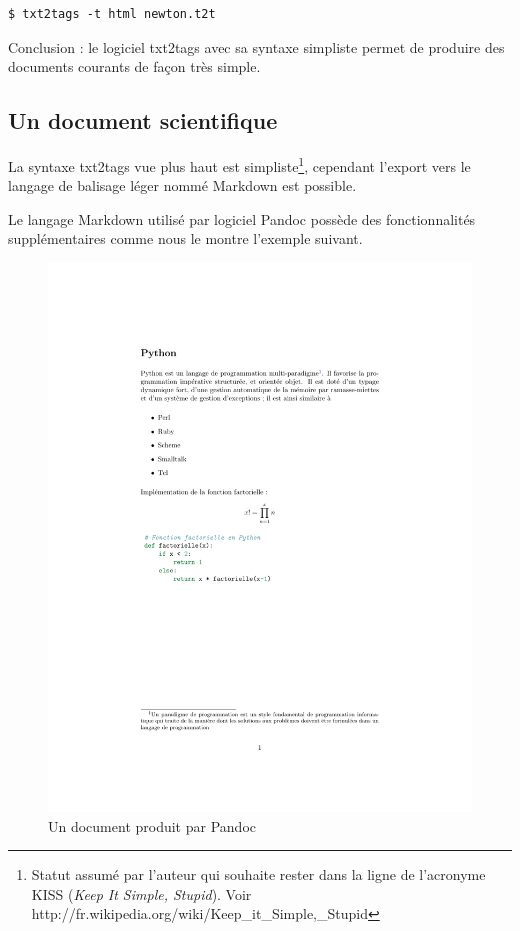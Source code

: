 \documentclass[]{article}
\makeatletter
\def\maxwidth{\ifdim\Gin@nat@width>\linewidth\linewidth
\else\Gin@nat@width\fi}
\let\Oldincludegraphics\includegraphics
\renewcommand{\includegraphics}[1]{\Oldincludegraphics[width=\maxwidth]{#1}}
\makeatother
\begin{document}
\begin{verbatim}
$ txt2tags -t html newton.t2t
\end{verbatim}
Conclusion : le logiciel txt2tags avec sa syntaxe simpliste permet de
produire des documents courants de façon très simple.

\subsection{Un document scientifique}

La syntaxe txt2tags vue plus haut est simpliste\footnote{Statut assumé
  par l'auteur qui souhaite rester dans la ligne de l'acronyme KISS
  (\emph{Keep It Simple, Stupid}). Voir
  http://fr.wikipedia.org/wiki/Keep\_it\_Simple,\_Stupid}, cependant
l'export vers le langage de balisage léger nommé Markdown est possible.

Le langage Markdown utilisé par logiciel Pandoc possède des
fonctionnalités supplémentaires comme nous le montre l'exemple suivant.

\begin{figure}[htbp]
\centering
\includegraphics{python.pdf}
\caption{Un document produit par Pandoc}
\end{figure}
\end{document}
